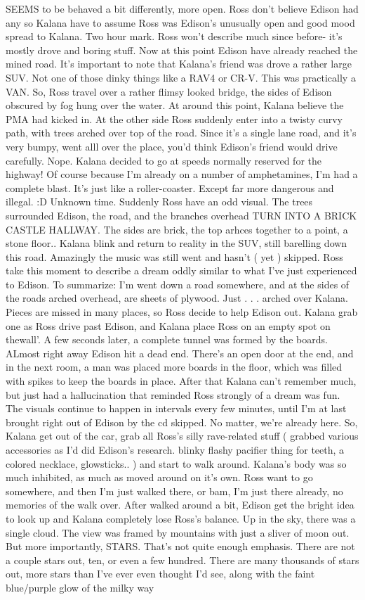 \documentclass[12pt]{book}
\begin{document}
SEEMS to be behaved a bit differently, more open. Ross don't believe Edison had any so Kalana have to assume Ross was Edison's unusually open and good mood spread to Kalana. Two hour mark. Ross won't describe much since before- it's mostly drove and boring stuff. Now at this point Edison have already reached the mined road. It's important to note that Kalana's friend was drove a rather large SUV. Not one of those dinky things like a RAV4 or CR-V. This was practically a VAN. So, Ross travel over a rather flimsy looked bridge, the sides of Edison obscured by fog hung over the water. At around this point, Kalana believe the PMA had kicked in. At the other side Ross suddenly enter into a twisty curvy path, with trees arched over top of the road. Since it's a single lane road, and it's very bumpy, went alll over the place, you'd think Edison's friend would drive carefully. Nope. Kalana decided to go at speeds normally reserved for the highway! Of course because I'm already on a number of amphetamines, I'm had a complete blast. It's just like a roller-coaster. Except far more dangerous and illegal. :D Unknown time. Suddenly Ross have an odd visual. The trees surrounded Edison, the road, and the branches overhead TURN INTO A BRICK CASTLE HALLWAY. The sides are brick, the top arhces together to a point, a stone floor.. Kalana blink and return to reality in the SUV, still barelling down this road. Amazingly the music was still went and hasn't ( yet ) skipped. Ross take this moment to describe a dream oddly similar to what I've just experienced to Edison. To summarize: I'm went down a road somewhere, and at the sides of the roads arched overhead, are sheets of plywood. Just . . .  arched over Kalana. Pieces are missed in many places, so Ross decide to help Edison out. Kalana grab one as Ross drive past Edison, and Kalana place Ross on an empty spot on thewall'. A few seconds later, a complete tunnel was formed by the boards. ALmost right away Edison hit a dead end. There's an open door at the end, and in the next room, a man was placed more boards in the floor, which was filled with spikes to keep the boards in place. After that Kalana can't remember much, but just had a hallucination that reminded Ross strongly of a dream was fun. The visuals continue to happen in intervals every few minutes, until I'm at last brought right out of Edison by the cd skipped. No matter, we're already here. So, Kalana get out of the car, grab all Ross's silly rave-related stuff ( grabbed various accessories as I'd did Edison's research. blinky flashy pacifier thing for teeth, a colored necklace, glowsticks.. ) and start to walk around. Kalana's body was so much inhibited, as much as moved around on it's own. Ross want to go somewhere, and then I'm just walked there, or bam, I'm just there already, no memories of the walk over. After walked around a bit, Edison get the bright idea to look up and Kalana completely lose Ross's balance. Up in the sky, there was a single cloud. The view was framed by mountains with just a sliver of moon out. But more importantly, STARS. That's not quite enough emphasis. There are not a couple stars out, ten, or even a few hundred. There are many thousands of stars out, more stars than I've ever even thought I'd see, along with the faint blue/purple glow of the milky way 
\end{document}

